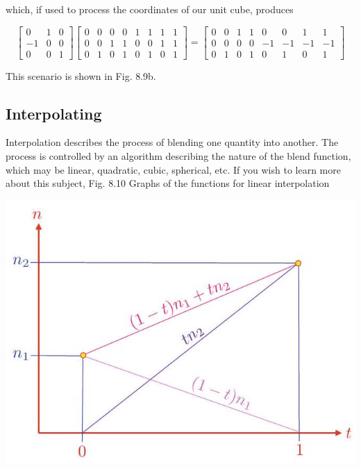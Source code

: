 \documentclass[10pt]{article}
\begin{document}
which, if used to process the coordinates of our unit cube, produces

$$
\left[\begin{array}{ccc}
0 & 1 & 0 \\
-1 & 0 & 0 \\
0 & 0 & 1
\end{array}\right]\left[\begin{array}{lllllllc}
0 & 0 & 0 & 0 & 1 & 1 & 1 & 1 \\
0 & 0 & 1 & 1 & 0 & 0 & 1 & 1 \\
0 & 1 & 0 & 1 & 0 & 1 & 0 & 1
\end{array}\right]=\left[\begin{array}{cccccccc}
0 & 0 & 1 & 1 & 0 & 0 & 1 & 1 \\
0 & 0 & 0 & 0 & -1 & -1 & -1 & -1 \\
0 & 1 & 0 & 1 & 0 & 1 & 0 & 1
\end{array}\right]
$$

This scenario is shown in Fig. 8.9b.

\subsection{Interpolating}
Interpolation describes the process of blending one quantity into another. The process is controlled by an algorithm describing the nature of the blend function, which may be linear, quadratic, cubic, spherical, etc. If you wish to learn more about this subject, Fig. 8.10 Graphs of the functions for linear interpolation

\begin{center}
\includegraphics[max width=\textwidth]{2023_04_20_41f1ceac5a31dc7d1b59g-163}
\end{center}
\end{document}

